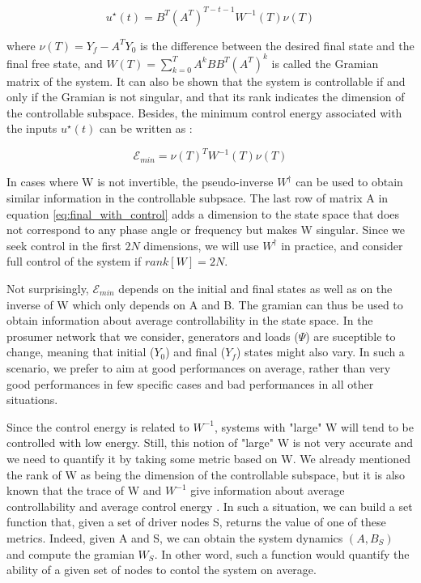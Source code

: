 \documentclass[conference]{IEEEtran}
\begin{document}
\begin{equation}
\label{eq:ustar}
 u^{\star}(t) = B^T(A^T)^{T-t-1}W^{-1}(T)\nu(T)
\end{equation}


where $ \nu(T) = Y_f - A^T Y_0 $ is the difference between the desired final state and the final free state, and $W(T) = \sum_{k=0}^{T} A^k B B^T (A^T)^k $ is called the Gramian matrix of the system. It can also be shown that the system is controllable if and only if the Gramian is not singular, and that its rank indicates the dimension of the controllable subspace. Besides, the minimum control energy associated with the inputs $ u^{\star}(t)$ can be written as :


\begin{equation}
\label{eq:energy}
 \mathcal{E}_{min} = \nu(T)^T W^{-1}(T) \nu(T)
\end{equation}

In cases where W is not invertible, the pseudo-inverse $W^{\dagger}$ can be used to obtain similar information in the controllable subpsace. The last row of matrix A in equation \ref{eq:final_with_control} adds a dimension to the state space that does not correspond to any phase angle or frequency but makes W singular. Since we seek control in the first $2N$ dimensions, we will use $W^{\dagger}$ in practice, and consider full control of the system if $rank[W]=2N$. 

Not surprisingly, $\mathcal{E}_{min}$ depends on the initial and final states as well as on the inverse of W which only depends on A and B. The gramian can thus be used to obtain information about average controllability in the state space. In the prosumer network that we consider, generators and loads ($\Psi$) are suceptible to change, meaning that initial ($Y_0$) and final ($Y_f$) states might also vary. In such a scenario, we prefer to aim at good performances on average, rather than very good performances in few specific cases and bad performances in all other situations.

Since the control energy is related to $ W^{-1} $, systems with "large" W will tend to be controlled with low energy. Still, this notion of "large" W is not very accurate and we need to quantify it by taking some metric based on W. We already mentioned the rank of W as being the dimension of the controllable subspace, but it is also known that the trace of W and $W^{-1}$ give information about average controllability and average control energy \cite{Summers2014}. In such a situation, we can build a set function that, given a set of driver nodes S, returns the value of one of these metrics. Indeed, given A and S, we can obtain the system dynamics $(A,B_S)$ and compute the gramian $W_S$. In other word, such a function would quantify the ability of a given set of nodes to contol the system on average.
\end{document}
